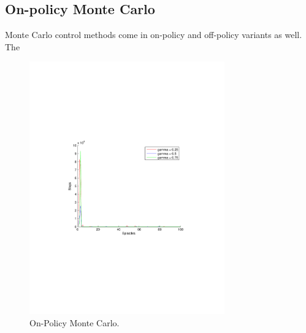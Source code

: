 \documentclass[a4paper,11pt]{article}
\begin{document}
\subsection*{On-policy Monte Carlo}
Monte Carlo control methods come in on-policy and off-policy variants as well.  The
~
\begin{figure}[t!]
  \centering
    \includegraphics[trim=4cm 8.5cm 4cm 8.5cm,clip,width=0.75\textwidth]{figures/onmc.pdf}
    \caption{On-Policy Monte Carlo.}
     \label{onmc}
\end{figure}
\newpage
\end{document}
